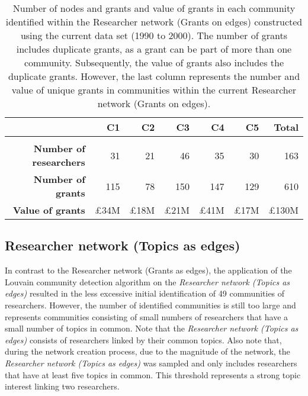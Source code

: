 {\begin{table}[!htbp]
\centering
\caption[Number of nodes and grants and value of grants in each community within the Researcher network (Grants as edges) constructed using the current data set (1990 to 2000).]{Number of nodes and grants and value of grants in each community identified within the Researcher network (Grants on edges) constructed using the current data set (1990 to 2000). The number of grants includes duplicate grants, as a grant can be part of more than one community. Subsequently, the value of grants also includes the duplicate grants. However, the last column represents the number and value of unique grants in communities within the current Researcher network (Grants on edges).}
\label{table:researcher_b_past2_numbers}
\begin{tabular}{r|rrrrrr}
{} & \textbf{C1} & \textbf{C2} & \textbf{C3} & \textbf{C4} & \textbf{C5} & \textbf{Total}\\
\hline\\
\textbf{Number of researchers} & {31}  & {21} & {46}  & {35}  & {30}  & {163}\\
\textbf{Number of grants}      & {115} & {78} & {150} & {147} & {129} & {610}\\
\textbf{Value of grants} & {\pounds34M} & {\pounds18M} & {\pounds21M} & {\pounds41M} & {\pounds17M} & {\pounds130M}
\end{tabular}
\end{table}

\subsection{Researcher network (Topics as edges)}

In contrast to the Researcher network (Grants as edges), the application of the Louvain community detection algorithm on the \textit{Researcher network (Topics as edges)} resulted in the less excessive initial identification of 49 communities of researchers. However, the number of identified communities is still too large and represents communities consisting of small numbers of researchers that have a small number of topics in common. Note that the \textit{Researcher network (Topics as edges)} consists of researchers linked by their common topics. Also note that, during the network creation process, due to the magnitude of the network, the \textit{Researcher network (Topics as edges)} was sampled and only includes researchers that have at least five topics in common. This threshold represents a strong topic interest linking two researchers.

}
